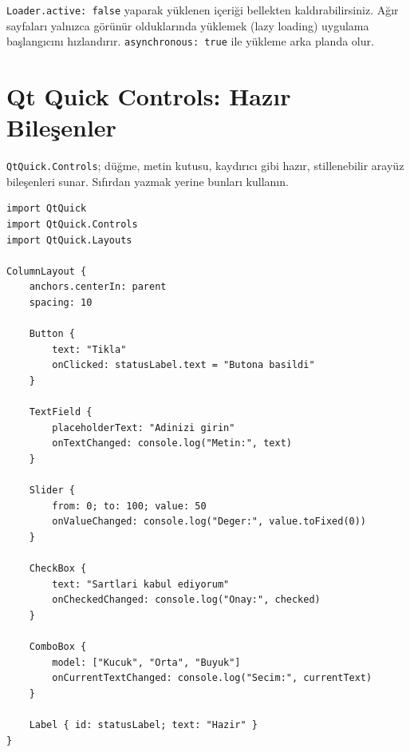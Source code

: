 \documentclass[11pt,a4paper]{article}
\newcommand{\kod}[1]{\texttt{\color{koyuGri}#1}}
\begin{document}
\begin{ipucukutu}
\kod{Loader.active: false} yaparak yüklenen içeriği bellekten kaldırabilirsiniz.
Ağır sayfaları yalnızca görünür olduklarında yüklemek (lazy loading) uygulama
başlangıcını hızlandırır. \kod{asynchronous: true} ile yükleme arka planda olur.
\end{ipucukutu}

\section{Qt Quick Controls: Hazır Bileşenler}

\kod{QtQuick.Controls}; düğme, metin kutusu, kaydırıcı gibi hazır, stillenebilir
arayüz bileşenleri sunar. Sıfırdan yazmak yerine bunları kullanın.

\begin{lstlisting}
import QtQuick
import QtQuick.Controls
import QtQuick.Layouts

ColumnLayout {
    anchors.centerIn: parent
    spacing: 10

    Button {
        text: "Tikla"
        onClicked: statusLabel.text = "Butona basildi"
    }

    TextField {
        placeholderText: "Adinizi girin"
        onTextChanged: console.log("Metin:", text)
    }

    Slider {
        from: 0; to: 100; value: 50
        onValueChanged: console.log("Deger:", value.toFixed(0))
    }

    CheckBox {
        text: "Sartlari kabul ediyorum"
        onCheckedChanged: console.log("Onay:", checked)
    }

    ComboBox {
        model: ["Kucuk", "Orta", "Buyuk"]
        onCurrentTextChanged: console.log("Secim:", currentText)
    }

    Label { id: statusLabel; text: "Hazir" }
}
\end{lstlisting}
\end{document}
